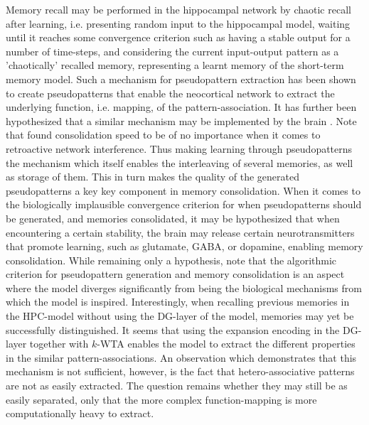 Memory recall may be performed in the hippocampal network by chaotic recall after learning, i.e. presenting random input to the hippocampal model, waiting until it reaches some convergence criterion such as having a stable output for a number of time-steps, and considering the current input-output pattern as a 'chaotically' recalled memory, representing a learnt memory of the short-term memory model. 
Such a mechanism for pseudopattern extraction has been shown to create pseudopatterns that enable the neocortical network to extract the underlying function, i.e. mapping, of the pattern-association. It has further been hypothesized that a similar mechanism may be implemented by the brain \citep{French2001, Ans1997}. Note that \cite{French2001} found consolidation speed to be of no importance when it comes to retroactive network interference. Thus making learning through pseudopatterns the mechanism which itself enables the interleaving of several memories, as well as storage of them. This in turn makes the quality of the generated pseudopatterns a key key component in memory consolidation.
When it comes to the biologically implausible convergence criterion for when pseudopatterns should be generated, and memories consolidated, it may be hypothesized that when encountering a certain stability, the brain may release certain neurotransmitters that promote learning, such as glutamate, GABA, or dopamine, enabling memory consolidation. While remaining only a hypothesis, note that the algorithmic criterion for pseudopattern generation and memory consolidation is an aspect where the model diverges significantly from being the biological mechanisms from which the model is inspired.
Interestingly, when recalling previous memories in the HPC-model without using the DG-layer of the model, memories may yet be successfully distinguished. It seems that using the expansion encoding in the DG-layer together with $k$-WTA enables the model to extract the different properties in the similar pattern-associations. An observation which demonstrates that this mechanism is not sufficient, however, is the fact that hetero-associative patterns are not as easily extracted. The question remains whether they may still be as easily separated, only that the more complex function-mapping is more computationally heavy to extract.

